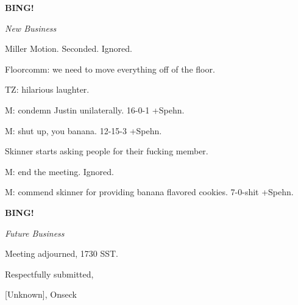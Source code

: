\documentclass[12pt]{article}
\newcommand{\bing}{{\bf BING!} }
\newcommand{\goto}[1]{\bing \vskip 12pt \centerline{{\em{#1}}}}
\begin{document}
\goto{New Business}

Miller Motion. Seconded. Ignored.

Floorcomm: we need to move everything off of the floor.

TZ: hilarious laughter.

M: condemn Justin unilaterally. 16-0-1 +Spehn.

M: shut up, you banana. 12-15-3 +Spehn.

Skinner starts asking people for their fucking member.

M: end the meeting. Ignored.

M: commend skinner for providing banana flavored cookies. 7-0-shit +Spehn.

\goto{Future Business}

\vspace{12pt}

\noindent
Meeting adjourned, 1730 SST.

\vspace{18pt}

\centerline{Respectfully submitted,}
\centerline{[Unknown], Onseck}
\end{document}
